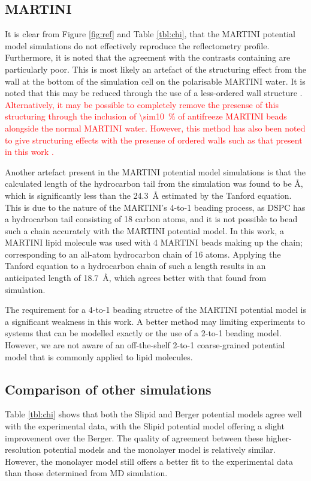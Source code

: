 \documentclass[amsmath,amssymb,twocolumn,superscriptaddress]{revtex4-1}
\begin{document}
\subsection{MARTINI}
It is clear from Figure \ref{fig:ref} and Table \ref{tbl:chi}, that the
MARTINI potential model simulations do not effectively reproduce the
reflectometry profile.
Furthermore, it is noted that the agreement with the contrasts containing
 are particularly poor.
This is most likely an artefact of the structuring effect from the wall at
the bottom of the simulation cell on the polarisable MARTINI water.
It is noted that this may be reduced through the use of a less-ordered wall
structure \cite{koutsioubas_combined_2016}.
\textcolor{red}{Alternatively, it may be possible to completely remove the presense of this
structuring through the inclusion of \SI{\sim10}{\percent} of antifreeze
MARTINI beads alongside the normal MARTINI water.
However, this method has also been noted to give structuring effects with
the presense of ordered walls such as that present in this
work \cite{marrink_comment_2010}.}

Another artefact present in the MARTINI potential model
simulations is that the calculated length of the hydrocarbon tail from the
simulation was found to be
\si{\angstrom}, which is
significantly less than the \SI{24.3}{\angstrom} estimated by the Tanford
equation.
This is due to the nature of the MARTINI's 4-to-1 beading process, as DSPC
has a hydrocarbon tail consisting of 18 carbon atoms, and it is not possible
to bead such a chain accurately with the MARTINI potential model.
In this work, a MARTINI lipid molecule was used with 4 MARTINI beads making
up the chain; corresponding to an all-atom hydrocarbon chain of 16 atoms.
Applying the Tanford equation to a hydrocarbon chain of such a length
results in an anticipated length of \SI{18.7}{\angstrom}, which agrees
better with that found from simulation.

The requirement for a 4-to-1 beading structre of the MARTINI potential model
is a significant weakness in this work.
A better method may limiting experiments to systems that can be modelled
exactly or the use of a 2-to-1 beading model.
However, we are not aware of an off-the-shelf 2-to-1 coarse-grained
potential model that is commonly applied to lipid molecules.

\subsection{Comparison of other simulations}
Table \ref{tbl:chi} shows that both the Slipid and Berger potential models
agree well with the experimental data, with the Slipid potential model
offering a slight improvement over the Berger.
The quality of agreement between these higher-resolution potential models
and the monolayer model is relatively similar.
However, the monolayer model still offers a better fit to the experimental
data than those determined from MD simulation.
\end{document}
